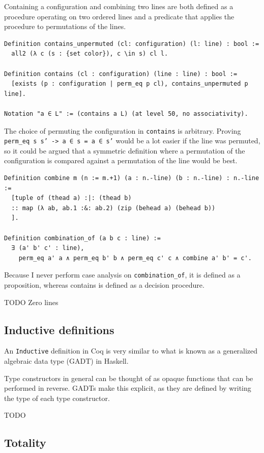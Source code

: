 \documentclass[english, 12pt, a4paper, sci, a-1b, online]{aaltothesis}
\newcommand\icoq[1]{\texttt{#1}}
\begin{document}
Containing a configuration and combining two lines are both defined as a procedure operating on two ordered lines and a predicate that applies the procedure to permutations of the lines.

\begin{verbatim}
Definition contains_unpermuted (cl: configuration) (l: line) : bool :=
  all2 (λ c (s : {set color}), c \in s) cl l.

Definition contains (cl : configuration) (line : line) : bool :=
  [exists (p : configuration | perm_eq p cl), contains_unpermuted p line].

Notation "a ∈ L" := (contains a L) (at level 50, no associativity).
\end{verbatim}

The choice of permuting the configuration in \icoq{contains} is arbitrary. Proving \icoq{perm_eq s s' -> a ∈ s = a ∈ s'} would be a lot easier if the line was permuted, so it could be argued that a symmetric definition where a permutation of the configuration is compared against a permutation of the line would be best.

\begin{verbatim}
Definition combine m (n := m.+1) (a : n.-line) (b : n.-line) : n.-line :=
  [tuple of (thead a) :|: (thead b)
  :: map (λ ab, ab.1 :&: ab.2) (zip (behead a) (behead b))
  ].

Definition combination_of (a b c : line) :=
  ∃ (a' b' c' : line),
    perm_eq a' a ∧ perm_eq b' b ∧ perm_eq c' c ∧ combine a' b' = c'.
\end{verbatim}

Because I never perform case analysis on \icoq{combination_of}, it is defined as a proposition, whereas contains is defined as a decision procedure.

TODO Zero lines

\subsection{Inductive definitions}

An \icoq{Inductive} definition in Coq is very similar to what is known as a generalized algebraic data type (GADT) in Haskell.

Type constructors in general can be thought of as opaque functions that can be performed in reverse. GADTs make this explicit, as they are defined by writing the type of each type constructor.

TODO

\subsection{Totality}\label{totality}
\end{document}
